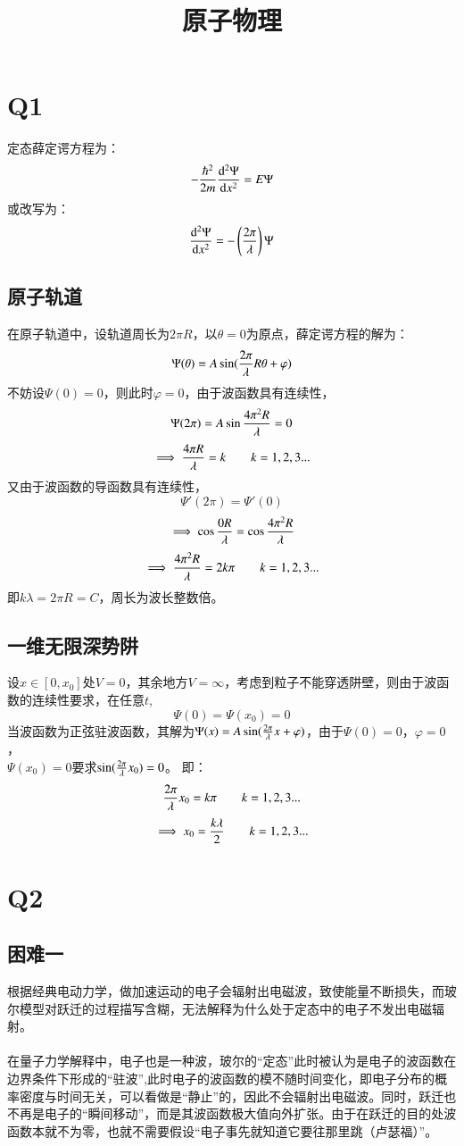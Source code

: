 \documentclass[UTF8,9pt]{ctexart}
\title{原子物理}
\begin{document}
 
    \maketitle 
    \section{Q1}
        定态薛定谔方程为：
        $$-\frac{\hbar^2}{2m}\frac{\mathrm{d} ^2 \Psi}{\mathrm{d} x^2}=E\Psi$$
        或改写为：
        $$\frac{\mathrm{d} ^2 \Psi}{\mathrm{d} x^2}=-\left(\frac{2\pi}{\lambda}\right)\Psi$$
        \subsection{原子轨道}
        在原子轨道中，设轨道周长为$2\pi R$，以$\theta=0$为原点，薛定谔方程的解为：
        $$\Psi(\theta)=A\sin(\frac{2\pi}{\lambda}R\theta+\varphi)$$
        不妨设$\Psi(0)=0$，则此时$\varphi=0$，由于波函数具有连续性，
        $$\Psi(2\pi)=A\sin\frac{4\pi^2R}{\lambda}=0$$
        $$\implies \frac{4\pi R}{\lambda}=k \qquad k=1,2,3...$$
        又由于波函数的导函数具有连续性，
        $$\Psi'(2\pi)=\Psi'(0)$$
        $$\implies \cos\frac{0R}{\lambda}=\cos\frac{4\pi^2R}{\lambda}$$
        $$\implies \frac{4\pi^2R}{\lambda}=2k\pi \qquad k=1,2,3...$$
        即$k\lambda=2\pi R=C$，周长为波长整数倍。

        \subsection{一维无限深势阱}
        设$x\in [0,x_0]$处$V=0$，其余地方$V=\infty$，考虑到粒子不能穿透阱壁，则由于波函数的连续性要求，在任意$t$,
        $$\Psi(0)=\Psi(x_0)=0$$
        当波函数为正弦驻波函数，其解为$\Psi(x)=A\sin(\frac{2\pi}{\lambda}x+\varphi)$，由于$\Psi(0)=0$，$\varphi=0$，\\ 
        $\Psi(x_0)=0$要求$\sin(\frac{2\pi}{\lambda}x_0)=0$。
        即：
        $$\frac{2\pi}{\lambda}x_0=k\pi \qquad k=1,2,3...$$
        $$\implies x_0=\frac{k\lambda}{2} \qquad k=1,2,3...$$
    \section{Q2}
        \subsection{困难一}
            根据经典电动力学，做加速运动的电子会辐射出电磁波，致使能量不断损失，而玻尔模型对跃迁的过程描写含糊，无法解释为什么处于定态中的电子不发出电磁辐射。
            \\
            \\
            在量子力学解释中，电子也是一种波，玻尔的“定态”此时被认为是电子的波函数在边界条件下形成的“驻波”,此时电子的波函数的模不随时间变化，即电子分布的概率密度与时间无关，可以看做是“静止”的，因此不会辐射出电磁波。同时，跃迁也不再是电子的“瞬间移动”，而是其波函数极大值向外扩张。由于在跃迁的目的处波函数本就不为零，也就不需要假设“电子事先就知道它要往那里跳（卢瑟福）”。
\end{document}
